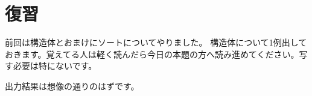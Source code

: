 \section{復習}
前回は構造体とおまけにソートについてやりました。
構造体について1例出しておきます。覚えてる人は軽く読んだら今日の本題の方へ読み進めてください。写す必要は特にないです。

出力結果は想像の通りのはずです。